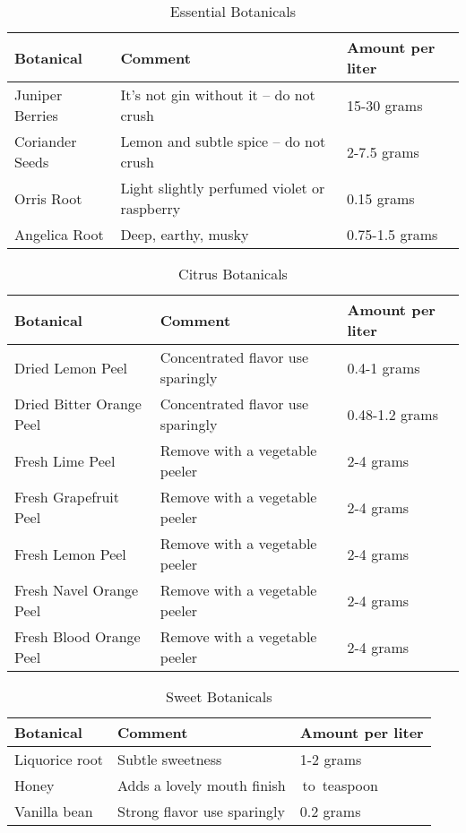 \documentclass[letterpaper]{recipePMG}
\newcommand{\quarter}{\nicefrac{1}{4} \,}
\newcommand{\half}{\nicefrac{1}{2} \,}
\begin{document}
\begin{table}[H]
    \centering
    \caption{Essential Botanicals}
    \begin{tabular}{@{}p{1.25in}p{3in}p{1.25in}@{}}
        \toprule
      Botanical &  Comment & Amount per liter \\
        \midrule
      	Juniper Berries & It's not gin without it -- do not crush & 15-30 grams  \\
 		Coriander Seeds & Lemon and subtle spice -- do not crush  & 2-7.5 grams \\
		Orris Root & Light slightly perfumed violet or raspberry & 0.15 grams \\
		Angelica Root &  Deep, earthy, musky & 0.75-1.5 grams \\
        \bottomrule
    \end{tabular}
    \label{tab:essential}
\end{table}

\begin{table}[H]
    \centering
    \caption{Citrus Botanicals}
    \begin{tabular}{@{}p{1.25in}p{3in}p{1.25in}@{}}
        \toprule
      Botanical &  Comment & Amount per liter \\
        \midrule
        Dried Lemon Peel & Concentrated flavor use sparingly & 0.4-1 grams\\
        Dried Bitter Orange Peel & Concentrated flavor  use sparingly & 0.48-1.2 grams\\
        Fresh Lime Peel & Remove with a vegetable peeler & 2-4 grams\\
        Fresh Grapefruit Peel & Remove with a vegetable peeler & 2-4 grams\\
        Fresh Lemon Peel & Remove with a vegetable peeler & 2-4 grams\\
        Fresh Navel Orange Peel & Remove with a vegetable peeler & 2-4 grams\\
        Fresh Blood Orange Peel & Remove with a vegetable peeler & 2-4 grams\\
        \bottomrule
    \end{tabular}
    \label{tab:citrus}
\end{table}

\begin{table}[H]
    \centering
    \caption{Sweet Botanicals}
    \begin{tabular}{@{}p{1.25in}p{3in}p{1.25in}@{}}
        \toprule
      Botanical &  Comment & Amount per liter \\
        \midrule
		Liquorice root & Subtle sweetness & 1-2 grams \\
		Honey & Adds a lovely mouth finish  & \quarter to \half teaspoon \\
		Vanilla bean & Strong flavor use sparingly & 0.2 grams \\
\end{tabular}
    \label{tab:sweet}
\end{table}
\end{document}

